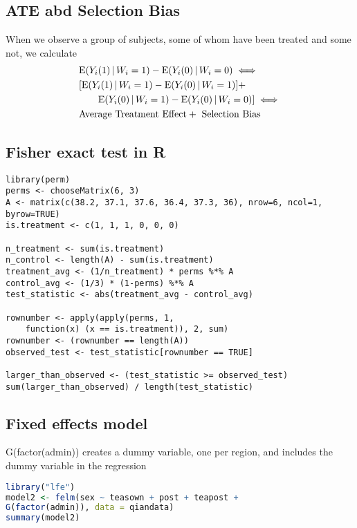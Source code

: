 \subsection {ATE abd Selection Bias} 
When we observe a group of subjects, some of whom have been treated and some not, we calculate
\begin {equation} \begin {split}
& \mathrm{E}(Y_i(1) \,\vert\,  W_i = 1) - \mathrm{E}(Y_i(0) \,\vert\,  W_i = 0) \iff \\
& [ \mathrm{E}(Y_i(1) \,\vert\,  W_i = 1) -  \mathrm{E}(Y_i(0) \,\vert\,  W_i = 1) ] +  \\
& \qquad \mathrm{E}(Y_i(0) \,\vert\,  W_i = 1) -  \mathrm{E}(Y_i(0) \,\vert\,  W_i = 0) ] \iff  \\
& \text {Average Treatment Effect} + \text { Selection Bias} \\
\end {split} \end {equation}

\subsection {Fisher exact test in R}
\begin{lstlisting}
library(perm)
perms <- chooseMatrix(6, 3)
A <- matrix(c(38.2, 37.1, 37.6, 36.4, 37.3, 36), nrow=6, ncol=1, byrow=TRUE)
is.treatment <- c(1, 1, 1, 0, 0, 0)

n_treatment <- sum(is.treatment)
n_control <- length(A) - sum(is.treatment)
treatment_avg <- (1/n_treatment) * perms %*% A
control_avg <- (1/3) * (1-perms) %*% A
test_statistic <- abs(treatment_avg - control_avg)

rownumber <- apply(apply(perms, 1, 
    function(x) (x == is.treatment)), 2, sum)
rownumber <- (rownumber == length(A))
observed_test <- test_statistic[rownumber == TRUE]

larger_than_observed <- (test_statistic >= observed_test)
sum(larger_than_observed) / length(test_statistic)
\end{lstlisting}


\subsection {Fixed effects model} \label {r: fem}
G(factor(admin)) creates a dummy variable, one per region, and includes the dummy variable
in the regression
\begin{lstlisting}[language=R]
library("lfe")
model2 <- felm(sex ~ teasown + post + teapost + 
G(factor(admin)), data = qiandata)
summary(model2)
\end{lstlisting}

